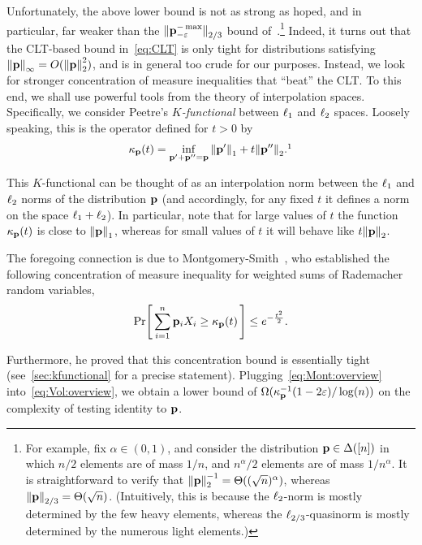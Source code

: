   Unfortunately, the above lower bound is not as strong as hoped, and in particular, far weaker than the $\norm{\p^{-\max}_{-\eps}}_{2/3}$ bound of~\cite{VV:14}.\footnote{For example, fix $\alpha \in (0,1)$, and consider the distribution $\p\in\distribs{[n]}$ in which $n/2$ elements are of mass $1/n$, and $n^{\alpha}/2$ elements are of mass $1/n^{\alpha}$. It is straightforward to verify that $\normtwo{\p}^{-1} = \bigTheta{(\sqrt{n})^{\alpha}}$, whereas $\norm{\p}_{2/3} = \bigTheta{\sqrt{n}}$. (Intuitively, this is because the $\lp[2]$-norm is mostly determined by the few heavy elements, whereas the $\lp[2/3]$-quasinorm is mostly determined by the numerous light elements.)} Indeed, it turns out that the CLT-based bound in~\cref{eq:CLT} is only tight for distributions satisfying $\norminf{\p} = O(\normtwo{\p}^2)$, and is in general too crude for our purposes.
   Instead, we look for stronger concentration of measure inequalities that ``beat'' the CLT. To this end, we shall use powerful tools from the theory of interpolation spaces. Specifically, we consider Peetre's \emph{$K$-functional} between $\lp[1]$ and $\lp[2]$ spaces. Loosely speaking, this is the operator defined for $t>0$ by
\begin{equation*}
    \kf{\p}(t) = \inf_{\p'+ \p'' =\p} \normone{\p'} + t\normtwo{\p''}.\footnotemark
\end{equation*}

This $K$-functional can be thought of as an interpolation norm between the $\lp[1]$ and $\lp[2]$ norms of the distribution $\p$ (and accordingly, for any fixed $t$ it defines a norm on the space $\lp[1]+\lp[2]$). In particular, note that for large values of $t$ the function $\kf{\p}(t)$ is close to $\normone{\p}$, whereas for small values of $t$ it will behave like $t\normtwo{\p}$.

The foregoing connection is due to Montgomery-Smith~\cite{MS:90}, who established the following concentration of measure inequality for weighted sums of Rademacher random variables,
\begin{equation}
\label{eq:Mont:overview}
  \probaOf{ \sum_{i=1}^n \p_i X_i \geq \kf{\p}(t) } \leq e^{-\frac{t^2}{2} }.
\end{equation}

Furthermore, he proved that this concentration bound is essentially tight (see~\cref{sec:kfunctional} for a precise statement). Plugging~\eqref{eq:Mont:overview} into~\eqref{eq:Vol:overview}, we obtain a lower bound of $\Omega(\kf{\p}^{-1}(1-2\eps)/\log(n))$ on the complexity of testing identity to $\p$.

